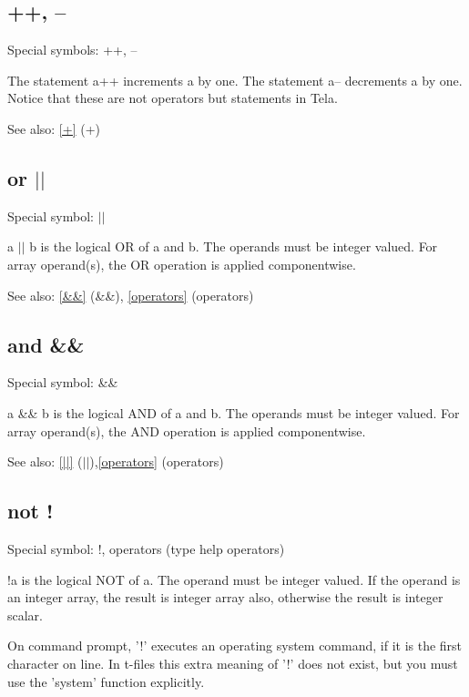 \documentclass[a4paper]{article}
\begin{document}
\subsection{++, --\label{++}}

Special symbols: ++, --

The statement a++ increments a by one. The statement a-- decrements a
by one. Notice that these are not operators but statements in Tela.

See also: \ref{+} {(+)}




\subsection{or $|$$|$\label{||}}

Special symbol: $|$$|$

a $|$$|$ b is the logical OR of a and b. The operands must be integer
valued.  For array operand(s), the OR operation is applied
componentwise.

See also: \ref{&&} {(\&\&)}, \ref{operators} {(operators)}




\subsection{and \&\&\label{&&}}

Special symbol: \&\&

a \&\& b is the logical AND of a and b. The operands must be integer
valued.  For array operand(s), the AND operation is applied
componentwise.

See also: \ref{||} {({$|$}{$|$})},\ref{operators} {(operators)}




\subsection{not !\label{!}}

Special symbol: !, operators (type help operators)

!a is the logical NOT of a. The operand must be integer valued. If the
operand is an integer array, the result is integer array also,
otherwise the result is integer scalar.

On command prompt, '!' executes an operating system command, if it is
the first character on line. In t-files this extra meaning of '!' does
not exist, but you must use the 'system' function explicitly.
\end{document}
